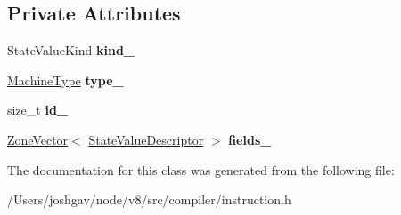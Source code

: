\subsection*{Private Attributes}
\begin{DoxyCompactItemize}
\item 
State\+Value\+Kind {\bfseries kind\+\_\+}\hypertarget{classv8_1_1internal_1_1compiler_1_1_state_value_descriptor_a174abfaf4057aa0a25e87e09699604eb}{}\label{classv8_1_1internal_1_1compiler_1_1_state_value_descriptor_a174abfaf4057aa0a25e87e09699604eb}

\item 
\hyperlink{classv8_1_1internal_1_1_machine_type}{Machine\+Type} {\bfseries type\+\_\+}\hypertarget{classv8_1_1internal_1_1compiler_1_1_state_value_descriptor_a0bf5ad6a73e8d5ca59ef496bd4619f9c}{}\label{classv8_1_1internal_1_1compiler_1_1_state_value_descriptor_a0bf5ad6a73e8d5ca59ef496bd4619f9c}

\item 
size\+\_\+t {\bfseries id\+\_\+}\hypertarget{classv8_1_1internal_1_1compiler_1_1_state_value_descriptor_a624dd385b8a936cb8170759d028f61d5}{}\label{classv8_1_1internal_1_1compiler_1_1_state_value_descriptor_a624dd385b8a936cb8170759d028f61d5}

\item 
\hyperlink{classv8_1_1internal_1_1_zone_vector}{Zone\+Vector}$<$ \hyperlink{classv8_1_1internal_1_1compiler_1_1_state_value_descriptor}{State\+Value\+Descriptor} $>$ {\bfseries fields\+\_\+}\hypertarget{classv8_1_1internal_1_1compiler_1_1_state_value_descriptor_a059fc9e3ea3d35d418c3212856026f2d}{}\label{classv8_1_1internal_1_1compiler_1_1_state_value_descriptor_a059fc9e3ea3d35d418c3212856026f2d}

\end{DoxyCompactItemize}


The documentation for this class was generated from the following file\+:\begin{DoxyCompactItemize}
\item 
/\+Users/joshgav/node/v8/src/compiler/instruction.\+h\end{DoxyCompactItemize}
